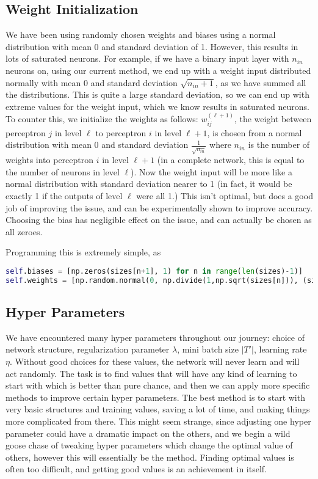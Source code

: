 \documentclass[10pt]{article}
\begin{document}
\subsection{Weight Initialization}
We have been using randomly chosen weights and biases using a normal distribution with mean 0 and standard deviation of 1. However, this results in lots of saturated neurons. For example, if we have a binary input layer with $n_{in}$ neurons on, using our current method, we end up with a weight input distributed normally with mean 0 and standard deviation $\sqrt{n_{in}+1}$, as we have summed all the distributions. This is quite a large standard deviation, so we can end up with extreme values for the weight input, which we know results in saturated neurons. To counter this, we initialize the weights as follows: $w_{ij}^{(\ell+1)}$, the weight between perceptron $j$ in level $\ell$ to perceptron $i$ in level $\ell+1$, is chosen from a normal distribution with mean 0 and standard deviation $\frac{1}{\sqrt{n_{in}}}$ where $n_{in}$ is the number of weights into  perceptron $i$ in level $\ell+1$ (in a complete network, this is equal to the number of neurons in level $\ell$). Now the weight input will be more like a normal distribution with standard deviation nearer to 1 (in fact, it would be exactly 1 if the outputs of level $\ell$ were all 1.) This isn't optimal, but does a good job of improving the issue, and can be experimentally shown to improve accuracy. Choosing the bias has negligible effect on the issue, and can actually be chosen as all zeroes. \par
Programming this is extremely simple, as
\begin{lstlisting}[language=Python, breaklines, basicstyle=\small]
self.biases = [np.zeros(sizes[n+1], 1) for n in range(len(sizes)-1)]
self.weights = [np.random.normal(0, np.divide(1,np.sqrt(sizes[n])), (sizes[n+1], sizes[n])) for n in range(len(sizes)-1)]
\end{lstlisting}

\subsection{Hyper Parameters}
We have encountered many hyper parameters throughout our journey: choice of network structure, regularization parameter $\lambda$, mini batch size $|T'|$, learning rate $\eta$. Without good choices for these values, the network will never learn and will act randomly. The task is to find values that will have any kind of learning to start with which is better than pure chance, and then we can apply more specific methods to improve certain hyper parameters. The best method is to start with very basic structures and training values, saving a lot of time, and making things more complicated from there. This might seem strange, since adjusting one hyper parameter could have a dramatic impact on the others, and we begin a wild goose chase of tweaking hyper parameters which change the optimal value of others, however this will essentially be the method. Finding optimal values is often too difficult, and getting good values is an achievement in itself.
\end{document}
